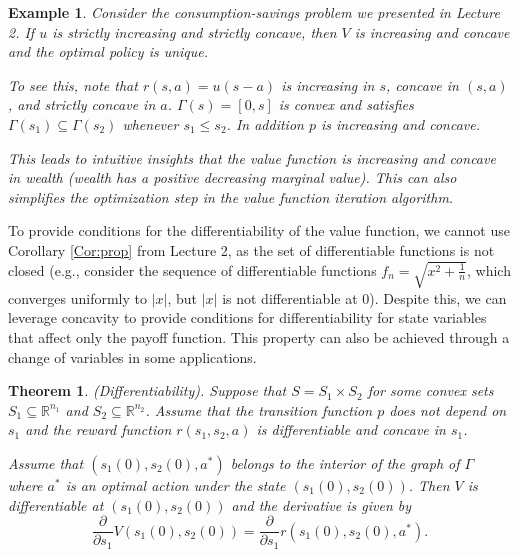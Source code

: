 \documentclass[letter,11pt]{article}
\newtheorem{theorem}{Theorem}[section]
\newtheorem{example}{Example}[section]
\begin{document}
\begin{example}
    Consider the consumption-savings problem we presented in Lecture 2. If $u$ is strictly increasing and strictly concave, then $V$ is increasing and concave and the optimal policy is unique.

    To see this, note that $r(s,a) = u(s-a)$ is increasing in $s$, concave in $(s,a)$, and strictly concave in $a$. $\Gamma (s) = [0,s]$ is convex and satisfies $\Gamma(s_{1}) \subseteq \Gamma(s_{2})$ whenever $s_{1} \leq s_{2}$. In addition $p$ is increasing and concave. 

    This leads to intuitive insights that the value function is increasing and concave in wealth (wealth has a positive decreasing marginal value). This can also simplifies the optimization step in the value function iteration algorithm.  
\end{example}

To provide conditions for the differentiability of the value function, we cannot use Corollary \ref{Cor:prop} from Lecture 2, as the set of differentiable functions is not closed (e.g., consider the sequence of differentiable functions \( f_n = \sqrt{x^2 + \frac{1}{n}} \), which converges uniformly to \(|x|\), but \(|x|\) is not differentiable at $0$). Despite this, we can leverage concavity to provide conditions for differentiability for state variables that affect only the payoff function. This property can also be achieved through a change of variables in some applications.

\begin{theorem} (Differentiability). \label{thm:value_diff}
    Suppose that $S=S_{1} \times S_{2}$ for some convex sets $S_{1} \subseteq \mathbb{R}^{n_{1}}$  and $S_{2} \subseteq \mathbb{R}^{n_{2}}$. Assume that the transition function $p$ does not depend on $s_{1}$ and the reward function $r(s_{1},s_{2},a)$ is differentiable and concave in $s_{1}$.  

Assume that $(s_{1}(0),s_{2}(0),a^{*})$ belongs to the interior of the graph of  $\Gamma$ where $a^{*}$ is an optimal action under the state $(s_{1}(0),s_{2}(0))$. Then $V$ is differentiable at $(s_{1}(0),s_{2}(0))$ and the  derivative  is given by 
    $$\frac{\partial }{\partial s_{1} } V(s_{1}(0),s_{2}(0)) = \frac{\partial }{\partial s_{1} } r(s_{1}(0),s_{2}(0),a^{*}).$$
\end{theorem}
\end{document}
